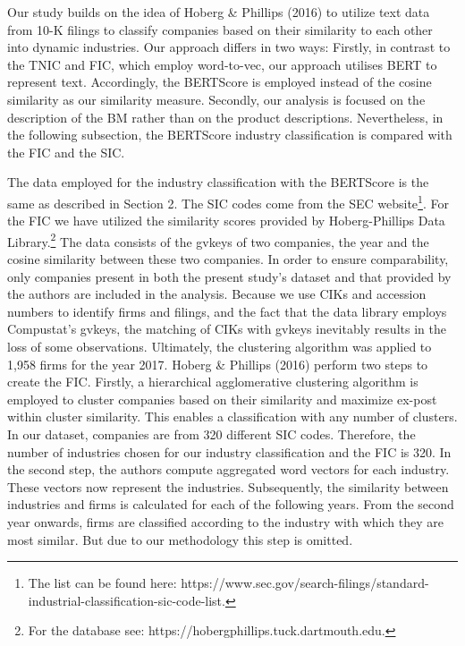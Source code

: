 \documentclass[
]{article}
\begin{document}
Our study builds on the idea of Hoberg \& Phillips (2016) to utilize
text data from 10-K filings to classify companies based on their
similarity to each other into dynamic industries. Our approach differs
in two ways: Firstly, in contrast to the TNIC and FIC, which employ
word-to-vec, our approach utilises BERT to represent text. Accordingly,
the BERTScore is employed instead of the cosine similarity as our
similarity measure. Secondly, our analysis is focused on the description
of the BM rather than on the product descriptions. Nevertheless, in the
following subsection, the BERTScore industry classification is compared
with the FIC and the SIC.

The data employed for the industry classification with the BERTScore is
the same as described in Section 2. The SIC codes come from the SEC
website\footnote{The list can be found here:
  https://www.sec.gov/search-filings/standard-industrial-classification-sic-code-list.}.
For the FIC we have utilized the similarity scores provided by
Hoberg-Phillips Data Library.\footnote{For the database see:
  https://hobergphillips.tuck.dartmouth.edu.} The data consists of the
gvkeys of two companies, the year and the cosine similarity between
these two companies. In order to ensure comparability, only companies
present in both the present study's dataset and that provided by the
authors are included in the analysis. Because we use CIKs and accession
numbers to identify firms and filings, and the fact that the data
library employs Compustat's gvkeys, the matching of CIKs with gvkeys
inevitably results in the loss of some observations. Ultimately, the
clustering algorithm was applied to 1,958 firms for the year 2017.
Hoberg \& Phillips (2016) perform two steps to create the FIC. Firstly,
a hierarchical agglomerative clustering algorithm is employed to cluster
companies based on their similarity and maximize ex-post within cluster
similarity. This enables a classification with any number of clusters.
In our dataset, companies are from 320 different SIC codes. Therefore,
the number of industries chosen for our industry classification and the
FIC is 320. In the second step, the authors compute aggregated word
vectors for each industry. These vectors now represent the industries.
Subsequently, the similarity between industries and firms is calculated
for each of the following years. From the second year onwards, firms are
classified according to the industry with which they are most similar.
But due to our methodology this step is omitted.
\end{document}
